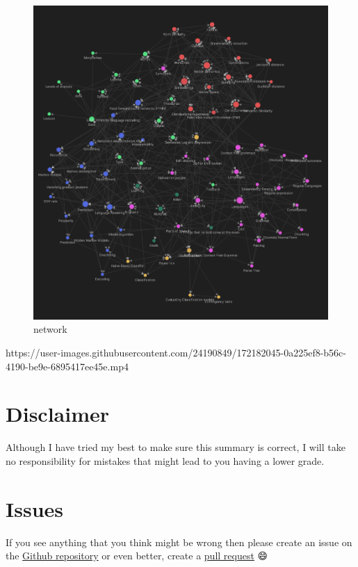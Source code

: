 \documentclass[
  11pt,
  british,
]{article}
\begin{document}
\begin{figure}
\centering
\includegraphics{network.png}
\caption{network}
\end{figure}

https://user-images.githubusercontent.com/24190849/172182045-0a225ef8-b56c-4190-be9e-6895417ee45e.mp4

\hypertarget{disclaimer}{%
\section{Disclaimer}\label{disclaimer}}

Although I have tried my best to make sure this summary is correct, I
will take no responsibility for mistakes that might lead to you having a
lower grade.

\hypertarget{issues}{%
\section{Issues}\label{issues}}

If you see anything that you think might be wrong then please create an
issue on the
\href{https://github.com/tintin10q/computational-linguistics-summary}{Github
repository} or even better, create a
\href{https://www.dataschool.io/how-to-contribute-on-github/}{pull
request} 😄
\end{document}
